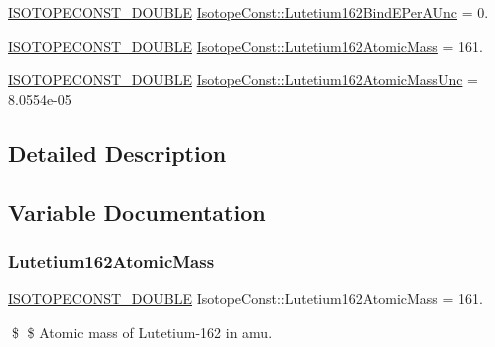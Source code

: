 \begin{DoxyCompactItemize}
\mbox{\hyperlink{group___isotope_const-_macros_ga8f45a7272ce02c0b4c65c44636ed719a}{I\+S\+O\+T\+O\+P\+E\+C\+O\+N\+S\+T\+\_\+\+D\+O\+U\+B\+LE}} \mbox{\hyperlink{group___isotope_const-_lutetium-_lu162_gaf1a33e6417152043b3dc09e54e0bc597}{Isotope\+Const\+::\+Lutetium162\+Bind\+E\+Per\+A\+Unc}} = 0.
\item 
\mbox{\hyperlink{group___isotope_const-_macros_ga8f45a7272ce02c0b4c65c44636ed719a}{I\+S\+O\+T\+O\+P\+E\+C\+O\+N\+S\+T\+\_\+\+D\+O\+U\+B\+LE}} \mbox{\hyperlink{group___isotope_const-_lutetium-_lu162_ga35b0afd69b391cefe5e6fe40aed67ebe}{Isotope\+Const\+::\+Lutetium162\+Atomic\+Mass}} = 161.
\item 
\mbox{\hyperlink{group___isotope_const-_macros_ga8f45a7272ce02c0b4c65c44636ed719a}{I\+S\+O\+T\+O\+P\+E\+C\+O\+N\+S\+T\+\_\+\+D\+O\+U\+B\+LE}} \mbox{\hyperlink{group___isotope_const-_lutetium-_lu162_gaf431590bfe8e90095d5d4aecfed09f32}{Isotope\+Const\+::\+Lutetium162\+Atomic\+Mass\+Unc}} = 8.\+0554e-\/05
\end{DoxyCompactItemize}


\subsection{Detailed Description}


\subsection{Variable Documentation}
\mbox{\label{group___isotope_const-_lutetium-_lu162_ga35b0afd69b391cefe5e6fe40aed67ebe}} 
\subsubsection{\texorpdfstring{Lutetium162\+Atomic\+Mass}{Lutetium162AtomicMass}}
{\footnotesize\ttfamily \mbox{\hyperlink{group___isotope_const-_macros_ga8f45a7272ce02c0b4c65c44636ed719a}{I\+S\+O\+T\+O\+P\+E\+C\+O\+N\+S\+T\+\_\+\+D\+O\+U\+B\+LE}} Isotope\+Const\+::\+Lutetium162\+Atomic\+Mass = 161.}

\$ \$ Atomic mass of Lutetium-\/162 in amu. \mbox{\label{group___isotope_const-_lutetium-_lu162_gaf431590bfe8e90095d5d4aecfed09f32}} 
